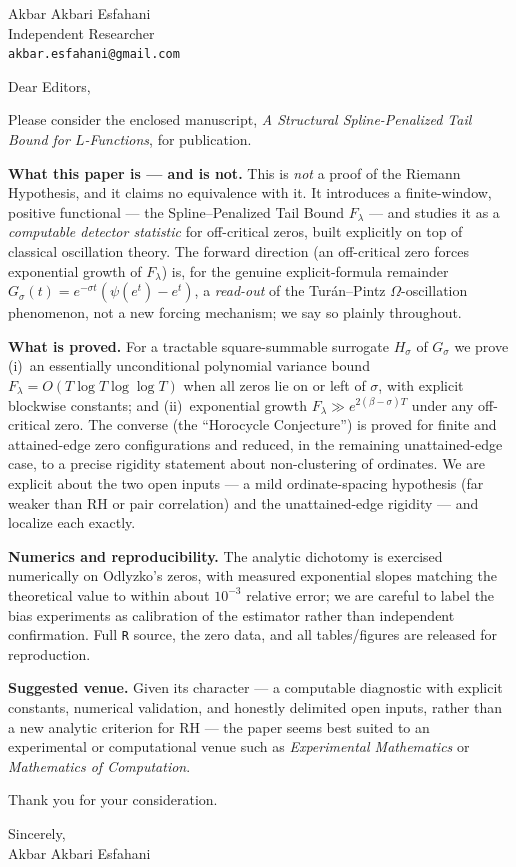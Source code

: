 \documentclass[12pt]{amsart}
\begin{document}
\begin{flushright}
Akbar Akbari Esfahani\\
Independent Researcher\\
\texttt{akbar.esfahani@gmail.com}
\end{flushright}

\noindent Dear Editors,

\medskip
Please consider the enclosed manuscript, \emph{A Structural Spline-Penalized
Tail Bound for $L$-Functions}, for publication.

\medskip
\noindent\textbf{What this paper is --- and is not.}
This is \emph{not} a proof of the Riemann Hypothesis, and it claims no
equivalence with it.  It introduces a finite-window, positive functional --- the
Spline--Penalized Tail Bound $F_\lambda$ --- and studies it as a
\emph{computable detector statistic} for off-critical zeros, built explicitly on
top of classical oscillation theory.  The forward direction (an off-critical zero
forces exponential growth of $F_\lambda$) is, for the genuine explicit-formula
remainder $G_\sigma(t)=e^{-\sigma t}(\psi(e^t)-e^t)$, a \emph{read-out} of the
Tur\'an--Pintz $\Omega$-oscillation phenomenon, not a new forcing mechanism; we
say so plainly throughout.

\medskip
\noindent\textbf{What is proved.}
For a tractable square-summable surrogate $H_\sigma$ of $G_\sigma$ we prove
(i)~an essentially unconditional polynomial variance bound
$F_\lambda=O(T\log T\log\log T)$ when all zeros lie on or left of $\sigma$, with
explicit blockwise constants; and (ii)~exponential growth
$F_\lambda\gg e^{2(\beta-\sigma)T}$ under any off-critical zero.  The converse
(the ``Horocycle Conjecture'') is proved for finite and attained-edge zero
configurations and reduced, in the remaining unattained-edge case, to a precise
rigidity statement about non-clustering of ordinates.  We are explicit about the
two open inputs --- a mild ordinate-spacing hypothesis (far weaker than RH or
pair correlation) and the unattained-edge rigidity --- and localize each exactly.

\medskip
\noindent\textbf{Numerics and reproducibility.}
The analytic dichotomy is exercised numerically on Odlyzko's zeros, with measured
exponential slopes matching the theoretical value to within about $10^{-3}$
relative error; we are careful to label the bias experiments as calibration of
the estimator rather than independent confirmation.  Full \texttt{R} source, the
zero data, and all tables/figures are released for reproduction.

\medskip
\noindent\textbf{Suggested venue.}
Given its character --- a computable diagnostic with explicit constants, numerical
validation, and honestly delimited open inputs, rather than a new analytic
criterion for RH --- the paper seems best suited to an experimental or
computational venue such as \emph{Experimental Mathematics} or
\emph{Mathematics of Computation}.

\medskip
Thank you for your consideration.

\medskip
\noindent Sincerely,\\
Akbar Akbari Esfahani
\end{document}
